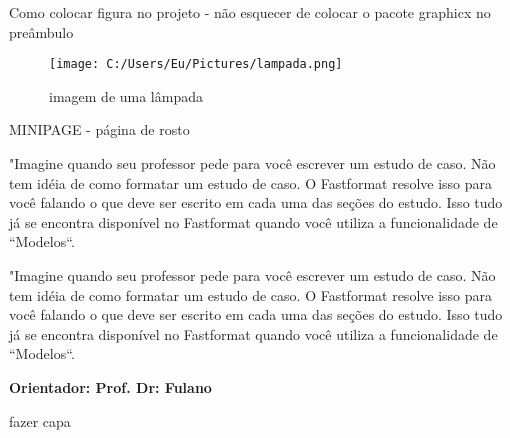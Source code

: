 \documentclass[12pt, a4paper, oneside]{book}
\begin{document}
\vspace{2cm}
Como colocar figura no projeto - não esquecer de colocar o pacote graphicx no preâmbulo
\vspace{2cm}


\begin{figure}[h]
 \centering
 \caption{imagem de uma lâmpada}
 \texttt{[image: C:/Users/Eu/Pictures/lampada.png]} %
 \label{imagemlampada}
  \end{figure}
  
\newpage
  
\vspace{2cm}
  MINIPAGE - página de rosto
  
\vspace{2cm}

\begin{minipage}{10cm}
"Imagine quando seu professor pede para você escrever um estudo de caso. Não tem idéia de como formatar um estudo de caso. O Fastformat resolve isso para você falando o que deve ser escrito em cada uma das seções do estudo. Isso tudo já se encontra disponível no Fastformat quando você utiliza a funcionalidade de “Modelos“.
\end{minipage} \newpage



\mbox{} %
\vspace{15cm}

\begin{flushright}
\begin{minipage}{10cm}
\hrulefill

"Imagine quando seu professor pede para você escrever um estudo de caso. Não tem idéia de como formatar um estudo de caso. O Fastformat resolve isso para você falando o que deve ser escrito em cada uma das seções do estudo. Isso tudo já se encontra disponível no Fastformat quando você utiliza a funcionalidade de “Modelos“.

\hrulefill

\textbf{Orientador: Prof. Dr: Fulano} 
\end{minipage}
\end{flushright} \newpage

fazer capa
\end{document}
